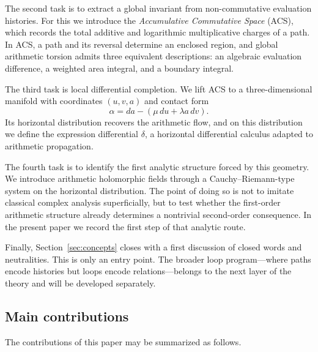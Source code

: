The second task is to extract a global invariant from non-commutative evaluation histories. For this we introduce the \emph{Accumulative Commutative Space} (ACS), which records the total additive and logarithmic multiplicative charges of a path. In ACS, a path and its reversal determine an enclosed region, and global arithmetic torsion admits three equivalent descriptions: an algebraic evaluation difference, a weighted area integral, and a boundary integral.

The third task is local differential completion. We lift ACS to a three-dimensional manifold with coordinates $(u,v,a)$ and contact form
\[
  \alpha = da-(\mu\,du+\lambda a\,dv).
\]
Its horizontal distribution recovers the arithmetic flow, and on this distribution we define the expression differential $\delta$, a horizontal differential calculus adapted to arithmetic propagation.

The fourth task is to identify the first analytic structure forced by this geometry. We introduce arithmetic holomorphic fields through a Cauchy--Riemann-type system on the horizontal distribution. The point of doing so is not to imitate classical complex analysis superficially, but to test whether the first-order arithmetic structure already determines a nontrivial second-order consequence. In the present paper we record the first step of that analytic route.

Finally, Section~\ref{sec:concepts} closes with a first discussion of closed words and neutralities. This is only an entry point. The broader loop program---where paths encode histories but loops encode relations---belongs to the next layer of the theory and will be developed separately.

\subsection{Main contributions}

The contributions of this paper may be summarized as follows.

